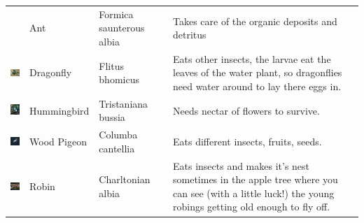 \documentclass[11pt,twoside,a4paper]{article}
\begin{document}
\begin{longtable}{ p{1.60cm} p{1.95cm} p{2.55cm} p{11.00cm} }
																&	Ant				&	Formica \newline saunterous \newline albia		
																&	Takes care of the organic deposits and detritus	\\
	\begin{minipage}[ht]{1.55cm} \includegraphics[width=1.50cm]{img/libelle.jpg} \end{minipage}		
																&	Dragonfly		&	Flitus \newline bhomicus		
																&	Eats other insects, the larvae eat the leaves of the water plant, so dragonflies need water around to lay there eggs in.	\\
	\begin{minipage}[ht]{1.55cm} \includegraphics[width=1.50cm]{img/kolibri.jpg} \end{minipage}		
																&	Hummingbird		&	Tristaniana bussia		
																&	Needs nectar of flowers to survive. 	\\
	\begin{minipage}[ht]{1.55cm} \includegraphics[width=1.50cm]{img/taube.jpg} \end{minipage}		
																&	Wood Pigeon		&	Columba \newline cantellia		
																&	Eats different insects, fruits, seeds. 	\\
	\begin{minipage}[ht]{1.55cm} \includegraphics[width=1.50cm]{img/robin.jpg} \end{minipage}		
																&	Robin			&	Charltonian \newline albia		
																&	Eats insects and makes it's nest sometimes in the apple tree where you can see (with a little luck!) the young robings getting old enough to fly off.	\\

\end{longtable}
\end{document}
